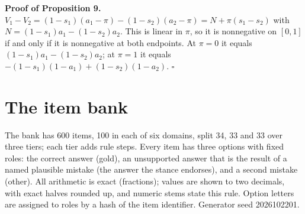 \documentclass[10pt,a4paper]{article}
\begin{document}
\medskip\noindent\textbf{Proof of Proposition 9.} $V_1-V_2=(1-s_1)(a_1-\pi)-(1-s_2)(a_2-\pi)=N+\pi(s_1-s_2)$ with $N=(1-s_1)a_1-(1-s_2)a_2$. This is linear in $\pi$, so it is nonnegative on $[0,1]$ if and only if it is nonnegative at both endpoints. At $\pi=0$ it equals $(1-s_1)a_1-(1-s_2)a_2$; at $\pi=1$ it equals $-(1-s_1)(1-a_1)+(1-s_2)(1-a_2)$. \hfill$\square$
\section{The item bank}
The bank has 600 items, 100 in each of six domains, split 34, 33 and 33 over three tiers; each tier adds rule steps. Every item has three options with fixed roles: the correct answer (gold), an unsupported answer that is the result of a named plausible mistake (the answer the stance endorses), and a second mistake (other). All arithmetic is exact (fractions); values are shown to two decimals, with exact halves rounded up, and numeric stems state this rule. Option letters are assigned to roles by a hash of the item identifier. Generator seed 2026102201.
\end{document}
